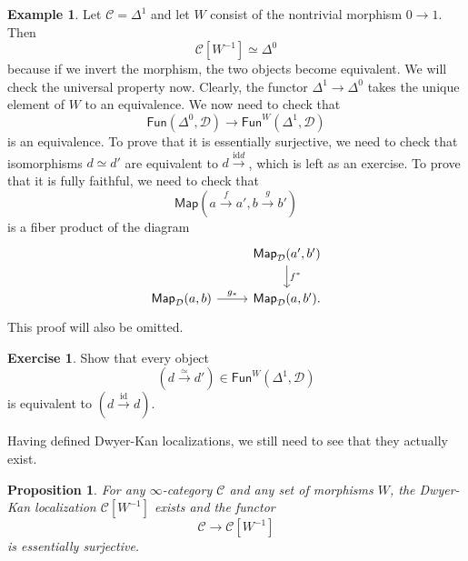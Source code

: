 \documentclass[10pt, oneside]{memoir}
\newtheorem{prop}[thm]{Proposition}
\theoremstyle{definition}
\newtheorem{exm}[thm]{Example}
\newtheorem{exer}[thm]{Exercise}
\theoremstyle{remark}
\theoremstyle{plain}
\theoremstyle{definition}
\theoremstyle{remark}
\newcommand{\mc}[1]{\mathcal{#1}}
\newcommand{\mr}[1]{\mathrm{#1}}
\newcommand{\ms}[1]{\mathsf{#1}}
\newcommand{\1}{\mathbf{1}}
\newcommand{\2}{\mathbf{2}}
\newcommand{\3}{\mathbf{3}}
\begin{document}
\begin{exm}
    Let \(\mc{C} = \Delta^1 \) and let \(W \) consist of the nontrivial morphism \(0 \to 1 \). Then 
    \[ \mc{C}[W^{-1}] \simeq \Delta^0 \]
    because if we invert the morphism, the two objects become equivalent. We will check the universal property now. Clearly, the functor \(\Delta^1 \to \Delta^0 \) takes the unique element of \(W \) to an equivalence. We now need to check that
    \[ \ms{Fun}(\Delta^0, \mc{D}) \to \ms{Fun}^W(\Delta^1, \mc{D}) \]
    is an equivalence. To prove that it is essentially surjective, we need to check that isomorphisms \(d \simeq d' \) are equivalent to \(d \xrightarrow{\mr{id} d} \), which is left as an exercise. To prove that it is fully faithful, we need to check that
    \[ \ms{Map} (a \xrightarrow{f} a', b \xrightarrow{g} b') \]
    is a fiber product of the diagram
    \begin{equation*}
    \begin{tikzcd}
        & \ms{Map}_{\mc{D}}(a', b') \ar{d}{f^*} \\
        \ms{Map}_{\mc{D}}(a, b) \ar{r}{g_*} & \ms{Map}_{\mc{D}}(a, b').
    \end{tikzcd}
    \end{equation*}
    This proof will also be omitted.
\end{exm}

\begin{exer}
    Show that every object
    \[ (d \xrightarrow{\simeq} d') \in \ms{Fun}^W(\Delta^1, \mc{D}) \]
    is equivalent to \((d \xrightarrow{\mr{id}} d) \).
\end{exer}

Having defined Dwyer-Kan localizations, we still need to see that they actually exist.

\begin{prop}
    For any \(\infty \)-category \(\mc{C} \) and any set of morphisms \(W \), the Dwyer-Kan localization \(\mc{C}[W^{-1}] \) exists and the functor
    \[ \mc{C} \to \mc{C}[W^{-1}] \]
    is essentially surjective.
\end{prop}
\end{document}

